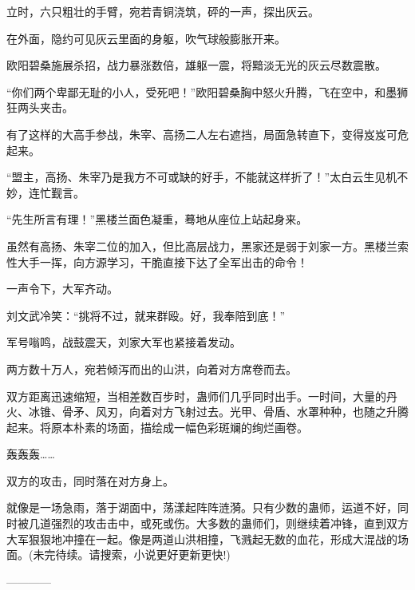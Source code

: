 \begin{this_body}
立时，六只粗壮的手臂，宛若青铜浇筑，砰的一声，探出灰云。

在外面，隐约可见灰云里面的身躯，吹气球般膨胀开来。

欧阳碧桑施展杀招，战力暴涨数倍，雄躯一震，将黯淡无光的灰云尽数震散。

“你们两个卑鄙无耻的小人，受死吧！”欧阳碧桑胸中怒火升腾，飞在空中，和墨狮狂两头夹击。

有了这样的大高手参战，朱宰、高扬二人左右遮挡，局面急转直下，变得岌岌可危起来。

“盟主，高扬、朱宰乃是我方不可或缺的好手，不能就这样折了！”太白云生见机不妙，连忙觐言。

“先生所言有理！”黑楼兰面色凝重，蓦地从座位上站起身来。

虽然有高扬、朱宰二位的加入，但比高层战力，黑家还是弱于刘家一方。黑楼兰索性大手一挥，向方源学习，干脆直接下达了全军出击的命令！

一声令下，大军齐动。

刘文武冷笑：“挑将不过，就来群殴。好，我奉陪到底！”

军号嗡鸣，战鼓震天，刘家大军也紧接着发动。

两方数十万人，宛若倾泻而出的山洪，向着对方席卷而去。

双方距离迅速缩短，当相差数百步时，蛊师们几乎同时出手。一时间，大量的丹火、冰锥、骨矛、风刃，向着对方飞射过去。光甲、骨盾、水罩种种，也随之升腾起来。将原本朴素的场面，描绘成一幅色彩斑斓的绚烂画卷。

轰轰轰……

双方的攻击，同时落在对方身上。

就像是一场急雨，落于湖面中，荡漾起阵阵涟漪。只有少数的蛊师，运道不好，同时被几道强烈的攻击击中，或死或伤。大多数的蛊师们，则继续着冲锋，直到双方大军狠狠地冲撞在一起。像是两道山洪相撞，飞溅起无数的血花，形成大混战的场面。(未完待续。请搜索，小说更好更新更快!)

------------

\end{this_body}

